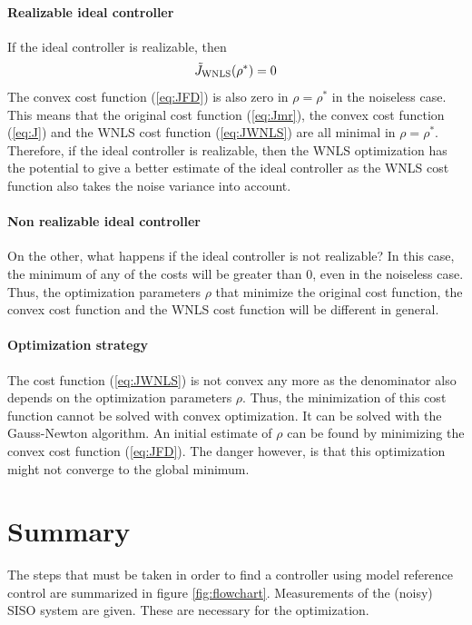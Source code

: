 \paragraph{Realizable ideal controller}
If the ideal controller is realizable, then
\begin{equation*}
\Tilde{J}_\mathrm{WNLS}(\rho^*) = 0
\end{equation*}
The convex cost function (\ref{eq:JFD}) is also zero in $\rho = \rho^*$ in the noiseless case. This means that the original cost function (\ref{eq:Jmr}), the convex cost function (\ref{eq:J}) and the WNLS cost function (\ref{eq:JWNLS}) are all minimal in $\rho = \rho^*$. Therefore, if the ideal controller is realizable, then the WNLS optimization has the potential to give a better estimate of the ideal controller as the WNLS cost function also takes the noise variance into account.


\paragraph{Non realizable ideal controller}
On the other, what happens if the ideal controller is not realizable? In this case, the minimum of any of the costs will be greater than 0, even in the noiseless case. Thus, the optimization parameters $\rho$ that minimize the original cost function, the convex cost function and the WNLS cost function will be different in general.


\paragraph{Optimization strategy}
The cost function (\ref{eq:JWNLS}) is not convex any more as the denominator also depends on the optimization parameters $\rho$. Thus, the minimization of this cost function cannot be solved with convex optimization. It can be solved with the Gauss-Newton algorithm. An initial estimate of $\rho$ can be found by minimizing the convex cost function (\ref{eq:JFD}). The danger however, is that this optimization might not converge to the global minimum.


\section{Summary}
The steps that must be taken in order to find a controller using model reference control are summarized in figure \ref{fig:flowchart}. Measurements of the (noisy) SISO system are given. These are necessary for the optimization.

